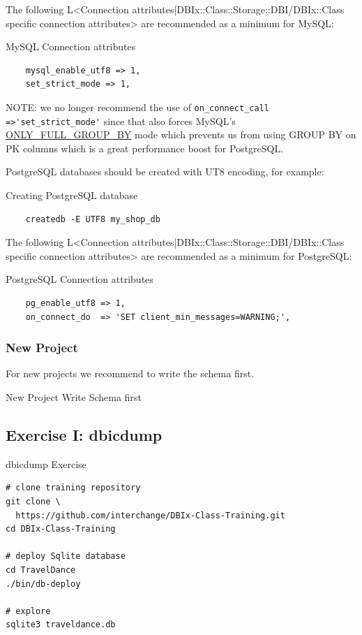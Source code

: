The following L<Connection attributes|DBIx::Class::Storage::DBI/DBIx::Class specific connection attributes> are recommended as a minimum for MySQL:

\begin{frame}[fragile]{MySQL Connection attributes}
\begin{lstlisting}
    mysql_enable_utf8 => 1,
    set_strict_mode => 1,
\end{lstlisting}
\end{frame}

NOTE: we no longer recommend the use of 
\verb|on_connect_call =>'set_strict_mode'| since that also forces MySQL's 
\href{https://dev.mysql.com/doc/refman/5.0/en/sql-mode.html#sqlmode\_only\_full\_group\_by}{ONLY\_FULL\_GROUP\_BY} mode which prevents us from using GROUP BY on PK columns which is a great performance boost for PostgreSQL.

PostgreSQL databases should be created with UT8 encoding, for example:

\begin{frame}[fragile]{Creating PostgreSQL database}
\begin{lstlisting}
    createdb -E UTF8 my_shop_db
\end{lstlisting}
\end{frame}

The following L<Connection attributes|DBIx::Class::Storage::DBI/DBIx::Class specific connection attributes> are recommended as a minimum for PostgreSQL:

\begin{frame}[fragile]{PostgreSQL Connection attributes}
\begin{lstlisting}
    pg_enable_utf8 => 1,
    on_connect_do  => 'SET client_min_messages=WARNING;',
\end{lstlisting}
\end{frame}

\subsubsection{New Project}

For new projects we recommend to write the schema first.

\begin{frame}[fragile]{New Project}
Write Schema first
\end{frame}

\subsection{Exercise I: dbicdump}
\begin{frame}[fragile]{dbicdump Exercise}
\begin{lstlisting}
# clone training repository
git clone \
  https://github.com/interchange/DBIx-Class-Training.git
cd DBIx-Class-Training

# deploy Sqlite database
cd TravelDance
./bin/db-deploy

# explore
sqlite3 traveldance.db
\end{lstlisting}
\end{frame}

